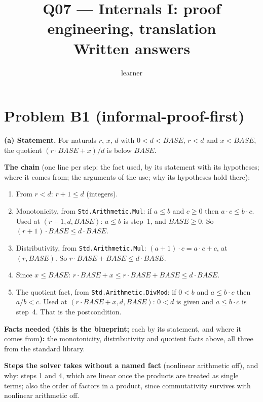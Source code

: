 \documentclass[11pt]{article}
\title{Q07 --- Internals I: proof engineering, translation \\ \large Written answers}
\author{learner}
\date{}
\begin{document}
\maketitle
\sloppy

\section*{Problem B1 (informal-proof-first)}\label{ans:B1}
\begin{answer}
\textbf{(a) Statement.} For naturals $r$, $x$, $d$ with
$0 < d < \mathit{BASE}$, $r < d$ and $x < \mathit{BASE}$, the quotient
$(r \cdot \mathit{BASE} + x) / d$ is below $\mathit{BASE}$.

\textbf{The chain} (one line per step: the fact used, by its statement with
its hypotheses; where it comes from; the arguments of the use; why its
hypotheses hold there):
\begin{enumerate}
\item From $r < d$: $r + 1 \leq d$ (integers).
\item Monotonicity, from \texttt{Std.Arithmetic.Mul}: if $a \leq b$ and
  $c \geq 0$ then $a \cdot c \leq b \cdot c$. Used at $(r + 1, d,
  \mathit{BASE})$: $a \leq b$ is step~1, and $\mathit{BASE} \geq 0$. So
  $(r + 1) \cdot \mathit{BASE} \leq d \cdot \mathit{BASE}$.
\item Distributivity, from \texttt{Std.Arithmetic.Mul}: $(a + 1) \cdot c =
  a \cdot c + c$, at $(r, \mathit{BASE})$. So $r \cdot \mathit{BASE} +
  \mathit{BASE} \leq d \cdot \mathit{BASE}$.
\item Since $x \leq \mathit{BASE}$: $r \cdot \mathit{BASE} + x \leq
  r \cdot \mathit{BASE} + \mathit{BASE} \leq d \cdot \mathit{BASE}$.
\item The quotient fact, from \texttt{Std.Arithmetic.DivMod}: if $0 < b$ and
  $a \leq b \cdot c$ then $a / b < c$. Used at $(r \cdot \mathit{BASE} + x,
  d, \mathit{BASE})$: $0 < d$ is given and $a \leq b \cdot c$ is step~4.
  That is the postcondition.
\end{enumerate}

\textbf{Facts needed (this is the blueprint;} each by its statement, and
where it comes from\textbf{):} the monotonicity, distributivity and quotient
facts above, all three from the standard library.

\textbf{Steps the solver takes without a named fact} (nonlinear arithmetic
off), and why: steps 1 and 4, which are linear once the products are treated
as single terms; also the order of factors in a product, since commutativity
survives with nonlinear arithmetic off.


\end{answer}
\end{document}
